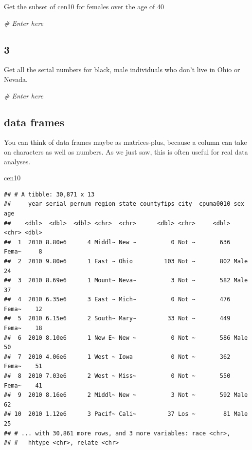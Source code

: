\documentclass[]{book}
\newenvironment{Shaded}{\begin{snugshade}}{\end{snugshade}}
\newcommand{\CommentTok}[1]{\textcolor[rgb]{0.56,0.35,0.01}{\textit{#1}}}
\newcommand{\NormalTok}[1]{#1}
\theoremstyle{definition}
\theoremstyle{definition}
\theoremstyle{definition}
\theoremstyle{remark}
\begin{document}
Get the subset of cen10 for females over the age of 40

\begin{Shaded}
\begin{Highlighting}[]
\CommentTok{# Enter here}
\end{Highlighting}
\end{Shaded}

\hypertarget{section-8}{%
\subsection*{3}\label{section-8}}

Get all the serial numbers for black, male individuals who don't live in Ohio or Nevada.

\begin{Shaded}
\begin{Highlighting}[]
\CommentTok{# Enter here}
\end{Highlighting}
\end{Shaded}

\hypertarget{data-frames}{%
\subsection{data frames}\label{data-frames}}

You can think of data frames maybe as matrices-plus, because a column can take on characters as well as numbers. As we just saw, this is often useful for real data analyses.

\begin{Shaded}
\begin{Highlighting}[]
\NormalTok{cen10}
\end{Highlighting}
\end{Shaded}

\begin{verbatim}
## # A tibble: 30,871 x 13
##     year serial pernum region state countyfips city  cpuma0010 sex     age
##    <dbl>  <dbl>  <dbl> <chr>  <chr>      <dbl> <chr>     <dbl> <chr> <dbl>
##  1  2010 8.80e6      4 Middl~ New ~          0 Not ~       636 Fema~     8
##  2  2010 9.80e6      1 East ~ Ohio         103 Not ~       802 Male     24
##  3  2010 8.69e6      1 Mount~ Neva~          3 Not ~       582 Male     37
##  4  2010 6.35e6      3 East ~ Mich~          0 Not ~       476 Fema~    12
##  5  2010 6.15e6      2 South~ Mary~         33 Not ~       449 Fema~    18
##  6  2010 8.10e6      1 New E~ New ~          0 Not ~       586 Male     50
##  7  2010 4.06e6      1 West ~ Iowa           0 Not ~       362 Fema~    51
##  8  2010 7.03e6      2 West ~ Miss~          0 Not ~       550 Fema~    41
##  9  2010 8.16e6      2 Middl~ New ~          3 Not ~       592 Male     62
## 10  2010 1.12e6      3 Pacif~ Cali~         37 Los ~        81 Male     25
## # ... with 30,861 more rows, and 3 more variables: race <chr>,
## #   hhtype <chr>, relate <chr>
\end{verbatim}
\end{document}
